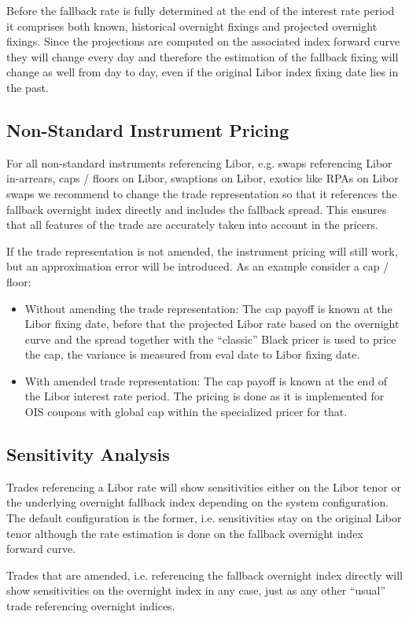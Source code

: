 Before the fallback rate is fully determined at the end of the interest rate period it comprises both known, historical
overnight fixings and projected overnight fixings. Since the projections are computed on the associated index forward
curve they will change every day and therefore the estimation of the fallback fixing will change as well from day to
day, even if the original Libor index fixing date lies in the past.

\subsection{Non-Standard Instrument Pricing}

For all non-standard instruments referencing Libor, e.g. swaps referencing Libor in-arrears, caps / floors on Libor,
swaptions on Libor, exotics like RPAs on Libor swaps we recommend to change the trade representation so that it
references the fallback overnight index directly and includes the fallback spread. This ensures that all features of the
trade are accurately taken into account in the pricers.

If the trade representation is not amended, the instrument pricing will still work, but an approximation error will be
introduced. As an example consider a cap / floor:

\begin{itemize}
\item Without amending the trade representation: The cap payoff is known at the Libor fixing date, before that the
  projected Libor rate based on the overnight curve and the spread together with the ``classic'' Black pricer is used to
  price the cap, the variance is measured from eval date to Libor fixing date.
\item With amended trade representation: The cap payoff is known at the end of the Libor interest rate period. The
  pricing is done as it is implemented for OIS coupons with global cap within the specialized pricer for that.
\end{itemize}

\subsection{Sensitivity Analysis}

Trades referencing a Libor rate will show sensitivities either on the Libor tenor or the underlying overnight fallback
index depending on the system configuration. The default configuration is the former, i.e. sensitivities stay on the
original Libor tenor although the rate estimation is done on the fallback overnight index forward curve.

Trades that are amended, i.e. referencing the fallback overnight index directly will show sensitivities on the overnight
index in any case, just as any other ``usual'' trade referencing overnight indices.



